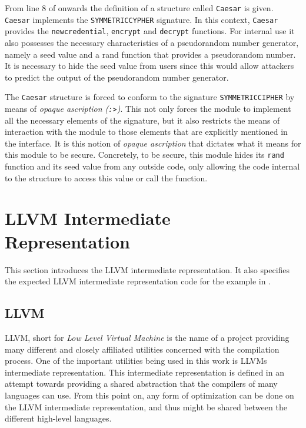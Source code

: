 \documentclass[10pt,a4paper,master=cws, masteroption=ai,english,inputenc=utf8]{kulemt}
\begin{document}
From line 8 of  onwards the definition of a structure called \texttt{Caesar} is given.
\texttt{Caesar} implements the \texttt{SYMMETRICCYPHER} signature.
In this context, \texttt{Caesar} provides the \texttt{newcredential}, \texttt{encrypt} and \texttt{decrypt} functions.
For internal use it also possesses the necessary characteristics of a pseudorandom number generator, namely a seed value and a rand function that provides a pseudorandom number.
It is necessary to hide the seed value from users since this would allow attackers to predict the output of the pseudorandom number generator.

The \texttt{Caesar} structure is forced to conform to the signature \texttt{SYMMETRICCIPHER} by means of \emph{opaque ascription (\texttt{:>})}.
This not only forces the module to implement all the necessary elements of the signature, but it also restricts the means of interaction with the module to those elements that are explicitly mentioned in the interface.
It is this notion of \emph{opaque ascription} that dictates what it means for this module to be secure.
Concretely, to be secure, this module hides its \texttt{rand} function and its seed value from any outside code, only allowing the code internal to the structure to access this value or call the function.


\section{LLVM Intermediate Representation \label{sec:LLVM}}
This section introduces the LLVM intermediate representation.
It also specifies the expected LLVM intermediate representation code for the example in .

\subsection{LLVM}
LLVM, short for \emph{Low Level Virtual Machine} is the name of a project providing many different and closely affiliated utilities concerned with the compilation process.
One of the important utilities being used in this work is LLVMs intermediate representation.
This intermediate representation is defined in an attempt towards providing a shared abstraction that the compilers of many languages can use.
From this point on, any form of optimization can be done on the LLVM intermediate representation, and thus might be shared between the different high-level languages.
\end{document}
